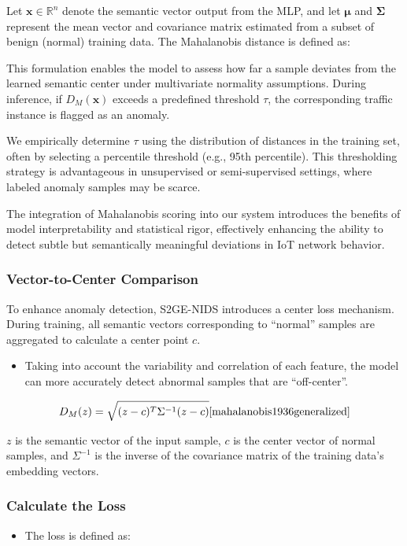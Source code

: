 \begin{ZhChapter}
Let $\mathbf{x} \in \mathbb{R}^n$ denote the semantic vector output from the MLP, and let $\boldsymbol{\mu}$ and $\boldsymbol{\Sigma}$ represent the mean vector and covariance matrix estimated from a subset of benign (normal) training data. The Mahalanobis distance is defined as:

This formulation enables the model to assess how far a sample deviates from the learned semantic center under multivariate normality assumptions. During inference, if $D_M(\mathbf{x})$ exceeds a predefined threshold $\tau$, the corresponding traffic instance is flagged as an anomaly.

We empirically determine $\tau$ using the distribution of distances in the training set, often by selecting a percentile threshold (e.g., 95th percentile). This thresholding strategy is advantageous in unsupervised or semi-supervised settings, where labeled anomaly samples may be scarce.

The integration of Mahalanobis scoring into our system introduces the benefits of model interpretability and statistical rigor, effectively enhancing the ability to detect subtle but semantically meaningful deviations in IoT network behavior.


\subsubsection{Vector-to-Center Comparison}
To enhance anomaly detection, S2GE-NIDS introduces a center loss mechanism. During training, all semantic vectors corresponding to ``normal'' samples are aggregated to calculate a center point $c$.

\begin{itemize}
    \item Taking into account the variability and correlation of each feature, the model can more accurately detect abnormal samples that are ``off-center''.
\end{itemize}

\begin{equation}
    D_M(z) = \sqrt{(z - c)^T \Sigma^{-1} (z - c)} \tag*{\makebox[3.8cm][r]{\cite{mahalanobis1936generalized}}}
    \label{eq:mahalanobis}
\end{equation}

$z$ is the semantic vector of the input sample, $c$ is the center vector of normal samples, and $\Sigma^{-1}$ is the inverse of the covariance matrix of the training data's embedding vectors.


\subsubsection{Calculate the Loss}
\begin{itemize}
    \item The loss is defined as:
\end{itemize}


\end{ZhChapter}
